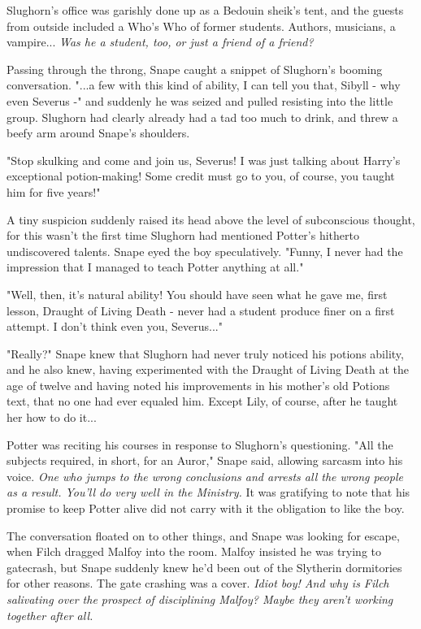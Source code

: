 \documentclass[a4paper,11pt]{article}
\begin{document}
Slughorn's office was garishly done up as a Bedouin sheik's tent, and the guests from outside included a Who's Who of former students. Authors, musicians, a vampire... \emph{Was he a student, too, or just a friend of a friend?}

Passing through the throng, Snape caught a snippet of Slughorn's booming conversation. "...a few with this kind of ability, I can tell you that, Sibyll - why even Severus -" and suddenly he was seized and pulled resisting into the little group. Slughorn had clearly already had a tad too much to drink, and threw a beefy arm around Snape's shoulders.

"Stop skulking and come and join us, Severus! I was just talking about Harry's exceptional potion-making! Some credit must go to you, of course, you taught him for five years!"

A tiny suspicion suddenly raised its head above the level of subconscious thought, for this wasn't the first time Slughorn had mentioned Potter's hitherto undiscovered talents. Snape eyed the boy speculatively. "Funny, I never had the impression that I managed to teach Potter anything at all."

"Well, then, it's natural ability! You should have seen what he gave me, first lesson, Draught of Living Death - never had a student produce finer on a first attempt. I don't think even you, Severus..."

"Really?" Snape knew that Slughorn had never truly noticed his potions ability, and he also knew, having experimented with the Draught of Living Death at the age of twelve and having noted his improvements in his mother's old Potions text, that no one had ever equaled him. Except Lily, of course, after he taught her how to do it...

Potter was reciting his courses in response to Slughorn's questioning. "All the subjects required, in short, for an Auror," Snape said, allowing sarcasm into his voice. \emph{One who jumps to the wrong conclusions and arrests all the wrong people as a result. You'll do very well in the Ministry.} It was gratifying to note that his promise to keep Potter alive did not carry with it the obligation to like the boy.

The conversation floated on to other things, and Snape was looking for escape, when Filch dragged Malfoy into the room. Malfoy insisted he was trying to gatecrash, but Snape suddenly knew he'd been out of the Slytherin dormitories for other reasons. The gate crashing was a cover. \emph{Idiot boy! And why is Filch salivating over the prospect of disciplining Malfoy? Maybe they aren't working together after all.}
\end{document}

